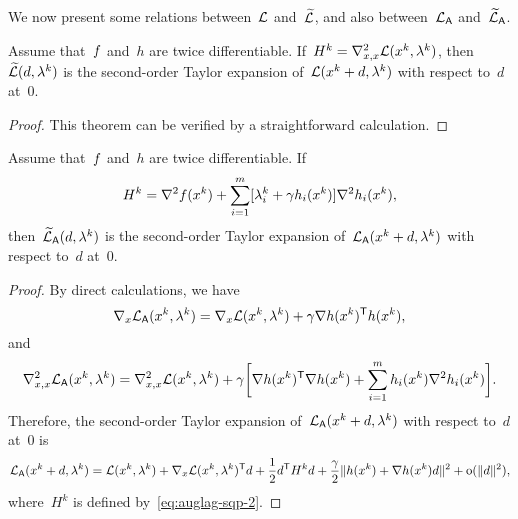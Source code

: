 We now present some relations between~$\lag$ and~$\lagalt$, and also between~$\mathcal{L}_{\mathsf{A}}$ and~$\widetilde{\mathcal{L}}_{\mathsf{A}}$.

\begin{theorem}
    \label{thm:auglag-sqp-1}
    Assume that~$f$ and~$h$ are twice differentiable.
    If~$H^k = \nabla_{x, x}^2 \lag(\iter[k], \lm[k])$, then~$\lagalt(\step, \lm[k])$ is the second-order Taylor expansion of~$\lag(\iter[k] + \step, \lm[k])$ with respect to~$d$ at~$0$.
\end{theorem}

\begin{proof}
    This theorem can be verified by a straightforward calculation.
\end{proof}

\begin{theorem}
    \label{thm:auglag-sqp-2}
    Assume that~$f$ and~$h$ are twice differentiable.
    If
    \begin{equation}
        \label{eq:auglag-sqp-2}
        H^k = \nabla^2 \obj(\iter[k]) + \sum_{i = 1}^m [\lm[k]_i + \gamma h_i(\iter[k])] \nabla^2 h_i(\iter[k]),
    \end{equation}
    then~$\auglagalt(\step, \lm[k])$ is the second-order Taylor expansion of~$\auglag(\iter[k] + d, \lm[k])$ with respect to~$d$ at~$0$.
\end{theorem}

\begin{proof}
    By direct calculations, we have
    \begin{equation*}
        \nabla_x \auglag(\iter[k], \lm[k]) = \nabla_x \lag(\iter[k], \lm[k]) + \gamma \nabla h(\iter[k])^{\T} h(\iter[k]),
    \end{equation*}
    and
    \begin{equation*}
        \nabla_{x, x}^2 \auglag(\iter[k], \lm[k]) = \nabla_{x, x}^2 \lag(\iter[k], \lm[k]) + \gamma \bigg[ \nabla h(\iter[k])^{\T} \nabla h(\iter[k]) + \sum_{i = 1}^m h_i(\iter[k]) \nabla^2 h_i(\iter[k]) \bigg].
    \end{equation*}
    Therefore, the second-order Taylor expansion of~$\auglag(\iter[k] + d, \lm[k])$ with respect to~$d$ at~$0$ is
    \begin{equation*}
        \auglag(\iter[k] + d, \lm[k]) = \lag(\iter[k], \lm[k]) + \nabla_x \lag(\iter[k], \lm[k])^{\T} d + \frac{1}{2} d^{\T} H^k d + \frac{\gamma}{2} \norm{h(\iter[k]) + \nabla h(\iter[k]) d}^2 + \smallo(\norm{d}^2),
    \end{equation*}
    where~$H^k$ is defined by~\cref{eq:auglag-sqp-2}.
\end{proof}

